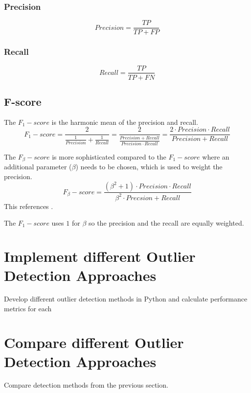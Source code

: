 \subsubsection{Precision}
\begin{equation*}
    Precision = \frac{TP}{TP + FP}
\end{equation*}

\subsubsection{Recall}
\begin{equation*}
    Recall = \frac{TP}{TP + FN}
\end{equation*}

\subsection{F-score}
\label{subsection:f-score}
The $F_1-score$ is the harmonic mean of the precision and recall.
\begin{equation*}
    F_1-score = \frac{2}{\frac{1}{Precision} + \frac{1}{Recall}} = \frac{2}{\frac{Precision + Recall}{Precision \cdot Recall}} = \frac{2 \cdot Precision \cdot Recall}{Precision + Recall}
\end{equation*}
\cite{sasakiTruthFmeasure, chinchorMUC4EvaluationMetrics1992}

The $F_\beta-score$ is more sophisticated compared to the $F_1-score$ where an additional parameter ($\beta$) needs to be chosen, which is used to weight the precision.
\begin{equation*}
    F_\beta-score = \frac{(\beta^2 + 1) \cdot Precision \cdot Recall}{\beta^2 \cdot Precsion + Recall}
\end{equation*}
\cite{tahaMetricsEvaluating3D2015}
This \cite{tahaMetricsEvaluating3D2015} references \cite{chinchorMUC4EvaluationMetrics1992}.


The $F_1-score$ uses $1$ for $\beta$ so the precision and the recall are equally weighted.



\section{Implement different Outlier Detection Approaches}
Develop different outlier detection methods in Python and calculate performance metrics for each
\section{Compare different Outlier Detection Approaches}
Compare detection methods from the previous section.

